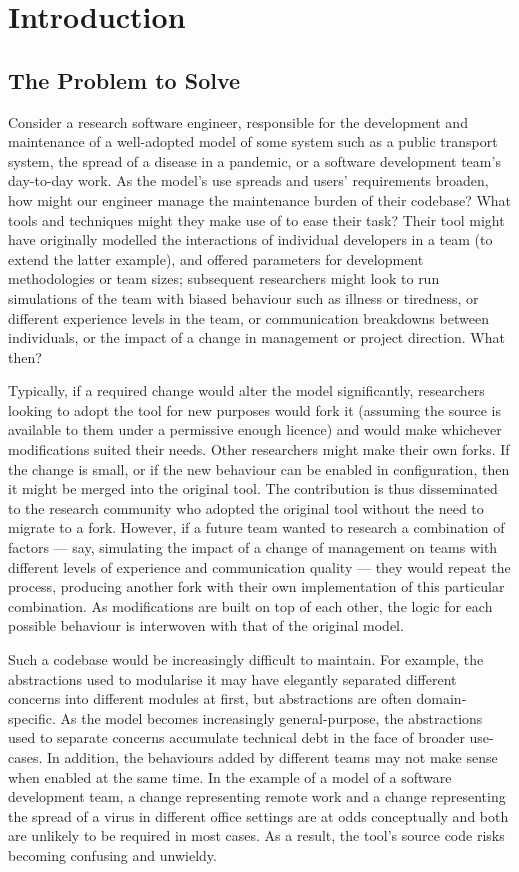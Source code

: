 \chapter{Introduction}

\section{The Problem to Solve}

Consider a research software engineer, responsible for the development and
maintenance of a well-adopted model of some \sociotechnical system such as a
public transport system, the spread of a disease in a pandemic, or a software
development team's day-to-day work. As the model's use spreads and users'
requirements broaden, how might our engineer manage the maintenance burden of
their codebase? What tools and techniques might they make use of to ease their
task? Their tool might have originally modelled the interactions of individual
developers in a team (to extend the latter example), and offered parameters for
development methodologies or team sizes; subsequent researchers might look to
run simulations of the team with biased behaviour such as illness or tiredness,
or different experience levels in the team, or communication breakdowns between
individuals, or the impact of a change in management or project direction. What
then?

Typically, if a required change would alter the model significantly, researchers
looking to adopt the tool for new purposes would fork it (assuming the source is
available to them under a permissive enough licence) and would make whichever
modifications suited their needs. Other researchers might make their own forks.
If the change is small, or if the new behaviour can be enabled in configuration,
then it might be merged into the original tool. The contribution is thus
disseminated to the research community who adopted the original tool without the
need to migrate to a fork. However, if a future team wanted to research a
combination of factors --- say, simulating the impact of a change of management
on teams with different levels of experience and communication quality --- they
would repeat the process, producing another fork with their own implementation
of this particular combination. As modifications are built on top of each other,
the logic for each possible behaviour is interwoven with that of the original
model.

Such a codebase would be increasingly difficult to maintain. For example, the
abstractions used to modularise it may have elegantly separated different
concerns into different modules at first, but abstractions are often
domain-specific. As the model becomes increasingly general-purpose, the
abstractions used to separate concerns accumulate technical debt in the face of
broader use-cases. In addition, the behaviours added by different teams may not
make sense when enabled at the same time. In the example of a model of a
software development team, a change representing remote work and a change
representing the spread of a virus in different office settings are at odds
conceptually and both are unlikely to be required in most cases. As a result,
the tool's source code risks becoming confusing and unwieldy.

